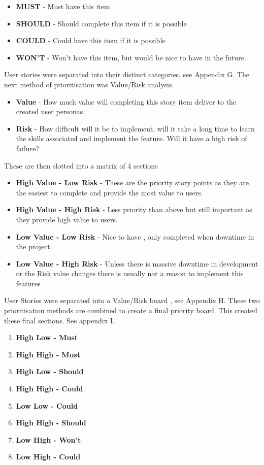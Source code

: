 \begin{itemize}
    \item \textbf{MUST} - Must have this item
    \item \textbf{SHOULD} - Should complete this item if it is possible
    \item \textbf{COULD} - Could have this item if it is possible
    \item \textbf{WON'T} - Won't have this item, but would be nice to have in the future.
\end{itemize}
\cite{moscow}
User stories were separated into their distinct categories, see Appendix G.
\newline
The next method of prioritisation was Value/Risk analysis.
\begin{itemize}
    \item \textbf{Value} - How much value will completing this story item deliver to the created user personas.
    \item \textbf{Risk} - How difficult will it be to implement, will it take a long time to learn the skills associated and implement the feature. Will it have a high risk of failure?
\end{itemize}
These are then slotted into a matrix of 4 sections
\begin{itemize}
    \item \textbf{High Value - Low Risk} - These are the priority story points as they are the easiest to complete and provide the most value to users.
    \item \textbf{High Value - High Risk} - Less priority than above but still important as they provide high value to users.
    \item \textbf{Low Value - Low Risk} - Nice to have , only completed when downtime in the project.
    \item \textbf{Low Value - High Risk} - Unless there is massive downtime in development or the Risk value changes there is usually not a reason to implement this features
\end{itemize}
User Stories were separated into a Value/Risk board , see Appendix H.
\newline
These two prioritisation methods are combined to create a final priority board. This created these final sections. See appendix I.
\begin{enumerate}
    \item \textbf{High Low - Must}
    \item \textbf{High High - Must}
    \item \textbf{High Low - Should}
    \item \textbf{High High - Could}
    \item \textbf{Low Low - Could}
    \item \textbf{High High - Should}
    \item \textbf{Low High - Won't}
    \item \textbf{Low High - Could}
\end{enumerate}

